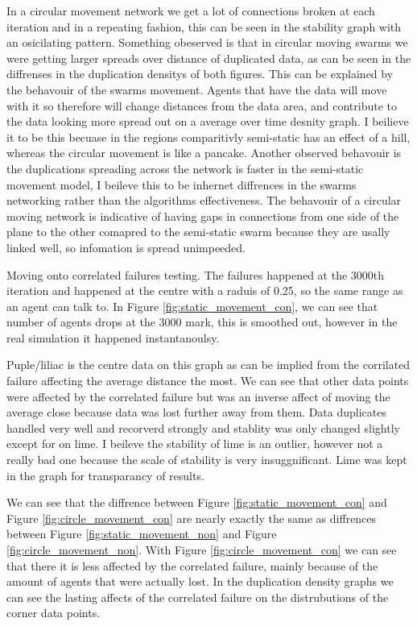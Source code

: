 \documentclass{UoYCSproject}
\begin{document}
In  a circular movement network we get a lot of connections broken at each iteration and in a repeating fashion, this can be seen in the stability graph with an osicilating pattern.
Something obeserved is that in circular moving swarms we were getting larger spreads over distance of duplicated data, as can be seen in the diffrenses in the duplication densitys of both figures.
This can be explained by the behavouir of the swarms movement.
Agents that have the data will move with it so therefore will change distances from the data area, and contribute to the data looking more spread out on a average over time desnity graph.
I beilieve it to be this becuase in the regions comparitivly semi-static has an effect of a hill, whereas the circular movement is like a pancake.
Another observed behavouir is the duplications spreading across the network is faster in the semi-static movement model, I beileve this to be inhernet diffrences in the swarms networking rather than the algorithms effectiveness.
The behavouir of a circular moving network is indicative of having gaps in connections from one side of the plane to the other comapred to the semi-static swarm because they are usally linked well, so infomation is spread unimpeeded.

Moving onto correlated failures testing.
The failures happened at the 3000th iteration and happened at the centre with a raduis of 0.25, so the same range as an agent can talk to.
In Figure \ref{fig:static_movement_con}, we can see that number of agents drops at the 3000 mark, this is smoothed out, however in the real simulation it happened instantanoulsy.

Puple/liliac is the centre data on this graph as can be implied from the corrilated failure affecting the average distance the most.
We can see that other data points were affected by the correlated failure but was an inverse affect of moving the average close because data was lost further away from them.
Data duplicates handled very well and recorverd strongly and stablity was only changed slightly except for on lime.
I beileve the stability of lime is an outlier, however not a really bad one because the scale of stability is very insuggnificant.
Lime was kept in the graph for transparancy of results.

We can see that the diffrence between Figure \ref{fig:static_movement_con} and Figure \ref{fig:circle_movement_con} are nearly exactly the same as diffrences between Figure \ref{fig:static_movement_non} and Figure \ref{fig:circle_movement_non}.
With Figure \ref{fig:circle_movement_con} we can see that there it is less affected by the correlated failure, mainly because of the amount of agents that were actually lost.
In the duplication density graphs we can see the lasting affects of the correlated failure on the distrubutions of the corner data points.
\end{document}
